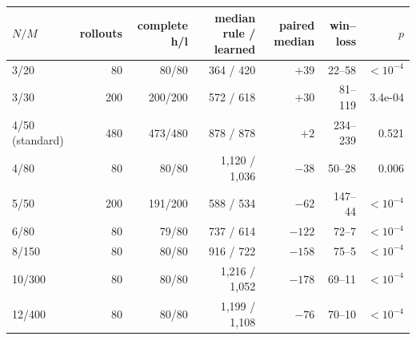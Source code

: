 \begin{tabular}{lrrrrrr}
\toprule
$N/M$ & rollouts & complete h/l & median rule / learned & paired median & win--loss & $p$ \\
\midrule
3/20 & 80 & 80/80 & 364 / 420 & $+39$ & 22--58 & $<10^{-4}$ \\
3/30 & 200 & 200/200 & 572 / 618 & $+30$ & 81--119 & 3.4e-04 \\
4/50 (standard) & 480 & 473/480 & 878 / 878 & $+2$ & 234--239 & 0.521 \\
4/80 & 80 & 80/80 & 1,120 / 1,036 & $-38$ & 50--28 & 0.006 \\
5/50 & 200 & 191/200 & 588 / 534 & $-62$ & 147--44 & $<10^{-4}$ \\
6/80 & 80 & 79/80 & 737 / 614 & $-122$ & 72--7 & $<10^{-4}$ \\
8/150 & 80 & 80/80 & 916 / 722 & $-158$ & 75--5 & $<10^{-4}$ \\
10/300 & 80 & 80/80 & 1,216 / 1,052 & $-178$ & 69--11 & $<10^{-4}$ \\
12/400 & 80 & 80/80 & 1,199 / 1,108 & $-76$ & 70--10 & $<10^{-4}$ \\
\bottomrule
\end{tabular}%
